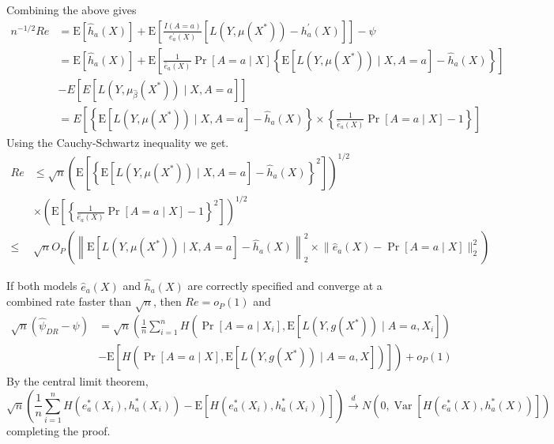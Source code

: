 Combining the above gives
$$
\begin{aligned}
n^{-1 / 2} R e & =\mathrm{E}\left[\widehat{h}_a(X)\right]+\mathrm{E}\left[\frac{I(A = a)}{e_a^{\prime}(X)}\left[L\left(Y, \mu\left(X^*\right)\right)-h_a^{\prime}(X)\right]\right]-\psi \\
& =\mathrm{E}\left[\widehat{h}_a(X)\right]+\mathrm{E}\left[\frac{1}{\widehat{e}_a(X)} \operatorname{Pr}[A=a \mid X]\left\{\mathrm{E}\left[L\left(Y, \mu\left(X^*\right)\right) \mid X, A=a\right]-\widehat{h}_a(X)\right\}\right] \\ 
&- E\left[E\left[L(Y, \mu_{\widehat{\beta}}(X^*))\mid X, A = a\right]\right]\\
& =E\left[\left\{\mathrm{E}\left[L\left(Y, \mu\left(X^*\right)\right) \mid X, A=a\right]-\widehat{h}_a(X)\right\}\times\left\{\frac{1}{\widehat{e}_a(X)} \operatorname{Pr}[A=a \mid X]-1\right\}\right]
\end{aligned}
$$
Using the Cauchy-Schwartz inequality we get.
$$
\begin{aligned}
Re & \leq \sqrt{n}\left(\mathrm{E}\left[\left\{\mathrm{E}\left[L\left(Y, \mu\left(X^*\right)\right) \mid X, A=a\right]-\widehat{h}_a(X)\right\}^2\right]\right)^{1 / 2} \\
& \times\left(\mathrm{E}\left[\left\{\frac{1}{\widehat{e}_a(X)} \operatorname{Pr}[A=a \mid X]-1\right\}^2\right]\right)^{1 / 2} \\
\leq & \sqrt{n} O_P\left(\left\|\mathrm{E}\left[L\left(Y, \mu\left(X^*\right)\right) \mid X, A=a\right]-\widehat{h}_a(X)\right\|_2^2 \times\Big\|\widehat{e}_a(X)-\operatorname{Pr}[A=a \mid X]\Big\|_2^2\right)
\end{aligned}
$$

If both models $\widehat{e}_a(X)$ and $\widehat{h}_a(X)$ are correctly specified and converge at a combined rate faster than $\sqrt{n}$, then $R e=o_P(1)$ and
$$
\begin{aligned}
\sqrt{n}\left(\widehat{\psi}_{D R}-\psi\right) & =\sqrt{n}\left(\frac{1}{n} \sum_{i=1}^n H\left(\operatorname{Pr}\left[A=a \mid X_i\right], \mathrm{E}\left[L\left(Y, g\left(X^*\right)\right) \mid A=a, X_i\right]\right)\right. \\
& \left.-\mathrm{E}\left[H\left(\operatorname{Pr}[A=a \mid X], \mathrm{E}\left[L\left(Y, g\left(X^*\right)\right) \mid A=a, X\right]\right)\right]\right)+o_P(1)
\end{aligned}
$$
By the central limit theorem,
$$
\sqrt{n}\left(\frac{1}{n} \sum_{i=1}^n H\left(e^*_a(X_i), h^*_a(X_i)\right)-\mathrm{E}\left[H\left(e^*_a(X_i), h^*_a(X_i)\right)\right]\right) \stackrel{d}{\longrightarrow} N\left(0, \operatorname{Var}\left[H\left(e^*_a(X), h^*_a(X)\right)\right]\right)
$$
completing the proof.

